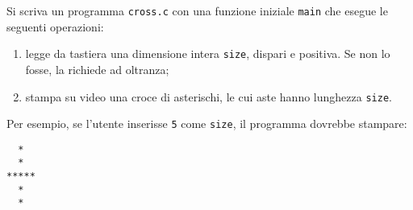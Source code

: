\documentclass[12pt]{article}
\begin{document}
Si scriva un programma \texttt{cross.c} con una funzione iniziale \texttt{main}
che esegue le seguenti operazioni:
\begin{enumerate}
\item legge da tastiera una dimensione intera \texttt{size}, dispari e positiva. Se non lo fosse,
  la richiede ad oltranza;
\item stampa su video una croce di asterischi, le cui aste hanno lunghezza \texttt{size}.
\end{enumerate}

Per esempio, se l'utente inserisse \texttt{5} come \texttt{size}, il programma dovrebbe stampare:
%
\begin{verbatim}
  *
  *
*****
  *
  *
\end{verbatim}
\end{document}
